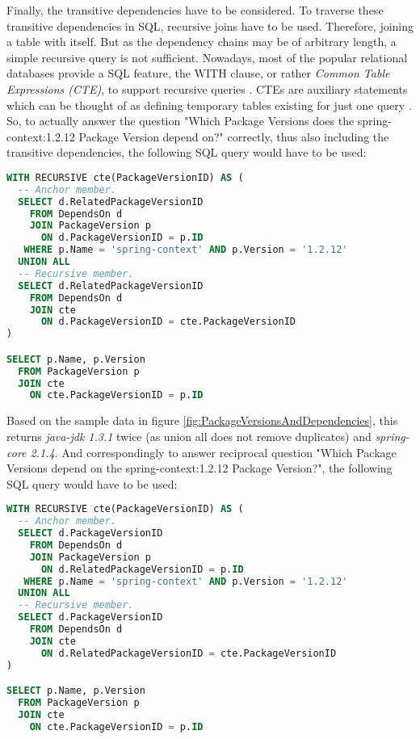 Finally, the transitive dependencies have to be considered. To traverse these transitive dependencies in SQL, recursive joins have to be used. Therefore, joining a table with itself. But as the dependency chains may be of arbitrary length, a simple recursive query is not sufficient. Nowadays, most of the popular relational databases provide a SQL feature, the WITH clause, or rather \emph{Common Table Expressions (CTE)}, %
to support recursive queries \cite{mysqlCTE, postgresCTE, sqliteCTE}. CTEs are auxiliary statements which can be thought of as defining temporary tables existing for just one query \cite{postgresCTE}. So, to actually answer the question "Which Package Versions does the spring-context:1.2.12 Package Version depend on?" correctly, thus also including the transitive dependencies, the following SQL query would have to be used:

\begin{lstlisting}[language=SQL, caption=Package Version Dependencies (including transitive), captionpos=b, label=lst:PackageVersionDependenciesIncTransitive]
WITH RECURSIVE cte(PackageVersionID) AS (
  -- Anchor member.
  SELECT d.RelatedPackageVersionID
    FROM DependsOn d
    JOIN PackageVersion p
      ON d.PackageVersionID = p.ID
   WHERE p.Name = 'spring-context' AND p.Version = '1.2.12'
  UNION ALL
  -- Recursive member.
  SELECT d.RelatedPackageVersionID
    FROM DependsOn d
    JOIN cte
      ON d.PackageVersionID = cte.PackageVersionID
)

SELECT p.Name, p.Version
  FROM PackageVersion p
  JOIN cte
    ON cte.PackageVersionID = p.ID
\end{lstlisting}

Based on the sample data in figure \ref{fig:PackageVersionsAndDependencies}, this returns \emph{java-jdk 1.3.1} twice (as union all does not remove duplicates) and \emph{spring-core 2.1.4}. And correspondingly to answer reciprocal question "Which Package Versions depend on the spring-context:1.2.12 Package Version?", the following SQL query would have to be used:

\begin{lstlisting}[language=SQL, caption=Package Version Reciprocal Dependencies (including transitive), captionpos=b, label=lst:PackageVersionReciprocalDependenciesIncTransitive]
WITH RECURSIVE cte(PackageVersionID) AS (
  -- Anchor member.
  SELECT d.PackageVersionID
    FROM DependsOn d
    JOIN PackageVersion p
      ON d.RelatedPackageVersionID = p.ID
   WHERE p.Name = 'spring-context' AND p.Version = '1.2.12'
  UNION ALL
  -- Recursive member.
  SELECT d.PackageVersionID
    FROM DependsOn d
    JOIN cte
      ON d.RelatedPackageVersionID = cte.PackageVersionID
)

SELECT p.Name, p.Version
  FROM PackageVersion p
  JOIN cte
    ON cte.PackageVersionID = p.ID
\end{lstlisting}

